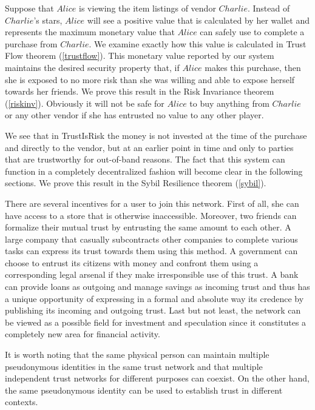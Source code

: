   Suppose that $Alice$ is viewing the item listings of vendor $Charlie$. Instead of $Charlie$'s stars, $Alice$ will see a
   positive value that is calculated by her wallet and represents the maximum monetary value that $Alice$ can safely use to
   complete a purchase from $Charlie$. We examine exactly how this value is calculated in Trust Flow theorem
   (\ref{trustflow}). This monetary value reported by our system maintains the desired security property that, if $Alice$
   makes this purchase, then she is exposed to no more risk than she was willing and able to expose herself towards her
   friends.  We prove this result in the Risk Invariance theorem (\ref{riskinv}). Obviously it will not be safe for $Alice$
   to buy anything from $Charlie$ or any other vendor if she has entrusted no value to any other player.

   We see that in TrustIsRisk the money is not invested at the time of the purchase and directly to the vendor, but at an
   earlier point in time and only to parties that are trustworthy for out-of-band reasons. The fact that this system can
   function in a completely decentralized fashion will become clear in the following sections. We prove this result in the
   Sybil Resilience theorem (\ref{sybil}).

   There are several incentives for a user to join this network. First of all, she can have access to a store that is
   otherwise inaccessible. Moreover, two friends can formalize their mutual trust by entrusting the same amount to each
   other. A large company that casually subcontracts other companies to complete various tasks can express its trust
   towards them using this method. A government can choose to entrust its citizens with money and confront them using a
   corresponding legal arsenal if they make irresponsible use of this trust. A bank can provide loans as outgoing and
   manage savings as incoming trust and thus has a unique opportunity of expressing in a formal and absolute way its
   credence by publishing its incoming and outgoing trust. Last but not least, the network can be viewed as a possible
   field for investment and speculation since it constitutes a completely new area for financial activity.

   It is worth noting that the same physical person can maintain multiple pseudonymous identities in the same trust network
   and that multiple independent trust networks for different purposes can coexist. On the other hand, the same
   pseudonymous identity can be used to establish trust in different contexts.
